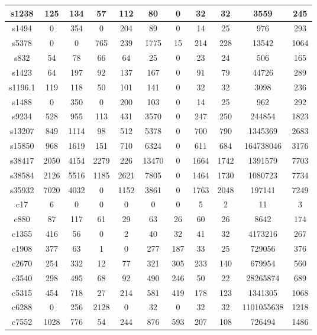 \documentclass[a4paper,12pt]{article}
\begin{document}
\begin{center}
\begin{tabular}{||c c c c c c c c c c c||}
\hline
s1238 & 125 & 134 & 57 & 112 & 80 & 0 & 32 & 32 & 3559 & 245 \\ 
\hline
s1494 & 0 & 354 & 0 & 204 & 89 & 0 & 14 & 25 & 976 & 293 \\ 
\hline
s5378 & 0 & 0 & 765 & 239 & 1775 & 15 & 214 & 228 & 13542 & 1064 \\ 
\hline
s832 & 54 & 78 & 66 & 64 & 25 & 0 & 23 & 24 & 506 & 165 \\ 
\hline
s1423 & 64 & 197 & 92 & 137 & 167 & 0 & 91 & 79 & 44726 & 289 \\ 
\hline
s1196.1 & 119 & 118 & 50 & 101 & 141 & 0 & 32 & 32 & 3098 & 236 \\ 
\hline
s1488 & 0 & 350 & 0 & 200 & 103 & 0 & 14 & 25 & 962 & 292 \\ 
\hline
s9234 & 528 & 955 & 113 & 431 & 3570 & 0 & 247 & 250 & 244854 & 1823 \\ 
\hline
s13207 & 849 & 1114 & 98 & 512 & 5378 & 0 & 700 & 790 & 1345369 & 2683 \\ 
\hline
s15850 & 968 & 1619 & 151 & 710 & 6324 & 0 & 611 & 684 & 164738046 & 3176 \\ 
\hline
s38417 & 2050 & 4154 & 2279 & 226 & 13470 & 0 & 1664 & 1742 & 1391579 & 7703 \\ 
\hline
s38584 & 2126 & 5516 & 1185 & 2621 & 7805 & 0 & 1464 & 1730 & 1080723 & 7734 \\ 
\hline
s35932 & 7020 & 4032 & 0 & 1152 & 3861 & 0 & 1763 & 2048 & 197141 & 7249 \\ 
\hline
c17 & 6 & 0 & 0 & 0 & 0 & 0 & 5 & 2 & 11 & 3 \\ 
\hline
c880 & 87 & 117 & 61 & 29 & 63 & 26 & 60 & 26 & 8642 & 174 \\ 
\hline
c1355 & 416 & 56 & 0 & 2 & 40 & 32 & 41 & 32 & 4173216 & 267 \\ 
\hline
c1908 & 377 & 63 & 1 & 0 & 277 & 187 & 33 & 25 & 729056 & 376 \\ 
\hline
c2670 & 254 & 332 & 12 & 77 & 321 & 305 & 233 & 140 & 679954 & 560 \\ 
\hline
c3540 & 298 & 495 & 68 & 92 & 490 & 246 & 50 & 22 & 28265874 & 689 \\ 
\hline
c5315 & 454 & 718 & 27 & 214 & 581 & 419 & 178 & 123 & 1341305 & 1068 \\ 
\hline
c6288 & 0 & 256 & 2128 & 0 & 32 & 0 & 32 & 32 & 1101055638 & 1218 \\ 
\hline
c7552 & 1028 & 776 & 54 & 244 & 876 & 593 & 207 & 108 & 726494 & 1486 \\ 
\hline
\end{tabular}
\end{center}
\end{document}
